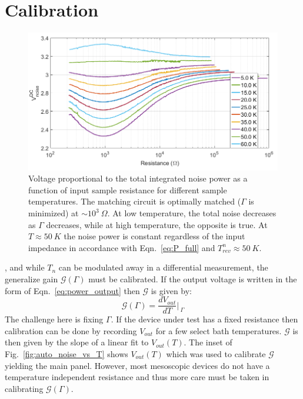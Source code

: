 \section{Calibration}
\label{section:calibration}
\begin{figure}
\centering
\includegraphics[width=120mm]{figures/Johnson_noise_thermometry/Vn_vs_R.png}
\caption{Voltage proportional to the total integrated noise power as a function of input sample resistance for different sample temperatures. The matching circuit is optimally matched ($\Gamma$ is minimized) at ${\sim}10^3~\Omega$. At low temperature, the total noise decreases as $\Gamma$ decreases, while at high temperature, the opposite is true. At $T\approx50~K$ the noise power is constant regardless of the input impedance in accordance with Eqn.~\ref{eq:P_full} and $T_{rev}^n\approx50~K$.}
\label{fig:JNT_Vn_vs_R}
\end{figure}
, and while $T_n$ can be modulated away in a differential measurement, the generalize gain $\mathcal{G}(\Gamma)$ must be calibrated. If the output voltage is written in the form of Eqn.~\ref{eq:power_output} then $\mathcal{G}$ is given by:
\begin{equation}
\mathcal{G}(\Gamma) = \frac{dV_{out}}{dT}\bigg\rvert_{~\Gamma}
\end{equation}
The challenge here is fixing $\Gamma$. If the device under test has a fixed resistance then calibration can be done by recording $V_{out}$ for a few select bath temperatures. $\mathcal{G}$ is then given by the slope of a linear fit to $V_{out}(T)$. The inset of Fig.~\ref{fig:auto_noise_vs_T} shows $V_{out}(T)$ which was used to calibrate $\mathcal{G}$ yielding the main panel. However, most mesoscopic devices do not have a temperature independent resistance and thus more care must be taken in calibrating $\mathcal{G}(\Gamma)$.
